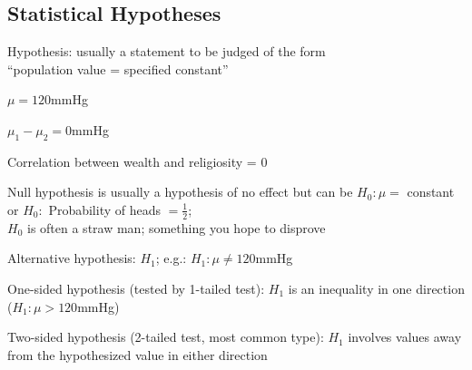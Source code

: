 \subsection{Statistical Hypotheses}
\bi
\item Hypothesis: usually a statement to be judged of the form \\
  ``population value = specified constant''
 \bi
 \item $\mu = 120$mmHg
 \item $\mu_{1} - \mu_{2} = 0$mmHg
 \item Correlation between wealth and religiosity = 0
 \ei
\item Null hypothesis is usually a hypothesis of no effect but can be
 $H_{0}: \mu =$ constant or $H_{0}:$ Probability of heads
 $=\frac{1}{2}$; \\
 $H_{0}$ is often a straw man; something you hope to disprove
\item Alternative hypothesis: $H_1$; e.g.: $H_{1}: \mu \neq 120$mmHg
\item One-sided hypothesis (tested by 1-tailed test): $H_{1}$ is an
  inequality in one direction ($H_{1}: \mu > 120$mmHg)
\item Two-sided hypothesis (2-tailed test, most common type): $H_{1}$
  involves values away from the hypothesized value in either direction
\ei

